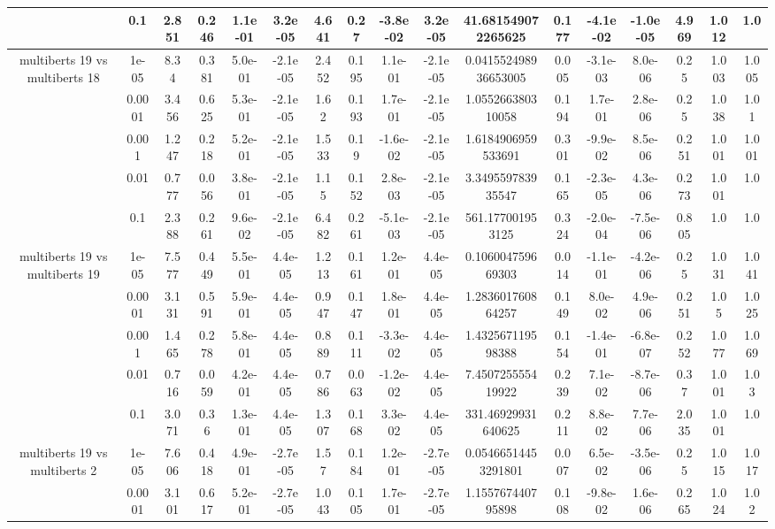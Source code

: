 \begin{tabular}{|c|c|c|c|c|c|c|c|c|c|c|c|c|c|c|c|c|}
 & 0.1 & 2.851 & 0.246 & 1.1e-01 & 3.2e-05 & 4.641 & 0.27 & -3.8e-02 & 3.2e-05 & 41.681549072265625 & 0.177 & -4.1e-02 & -1.0e-05 & 4.969 & 1.012 & 1.0 \\
\hline
\multirow{5}{*}{multiberts 19 vs multiberts 18} & 1e-05 & 8.34 & 0.381 & 5.0e-01 & -2.1e-05 & 2.452 & 0.195 & 1.1e-01 & -2.1e-05 & 0.041552498936653005 & 0.005 & -3.1e-03 & 8.0e-06 & 0.25 & 1.003 & 1.005 \\
 & 0.0001 & 3.456 & 0.625 & 5.3e-01 & -2.1e-05 & 1.62 & 0.193 & 1.7e-01 & -2.1e-05 & 1.055266380310058 & 0.194 & 1.7e-01 & 2.8e-06 & 0.25 & 1.038 & 1.01 \\
 & 0.001 & 1.247 & 0.218 & 5.2e-01 & -2.1e-05 & 1.533 & 0.19 & -1.6e-02 & -2.1e-05 & 1.6184906959533691 & 0.301 & -9.9e-02 & 8.5e-06 & 0.251 & 1.001 & 1.001 \\
 & 0.01 & 0.777 & 0.056 & 3.8e-01 & -2.1e-05 & 1.15 & 0.152 & 2.8e-03 & -2.1e-05 & 3.349559783935547 & 0.165 & -2.3e-05 & 4.3e-06 & 0.273 & 1.001 & 1.0 \\
 & 0.1 & 2.388 & 0.261 & 9.6e-02 & -2.1e-05 & 6.482 & 0.261 & -5.1e-03 & -2.1e-05 & 561.177001953125 & 0.324 & -2.0e-04 & -7.5e-06 & 0.805 & 1.0 & 1.0 \\
\hline
\multirow{5}{*}{multiberts 19 vs multiberts 19} & 1e-05 & 7.577 & 0.449 & 5.5e-01 & 4.4e-05 & 1.213 & 0.161 & 1.2e-01 & 4.4e-05 & 0.106004759669303 & 0.014 & -1.1e-01 & -4.2e-06 & 0.25 & 1.031 & 1.041 \\
 & 0.0001 & 3.131 & 0.591 & 5.9e-01 & 4.4e-05 & 0.947 & 0.147 & 1.8e-01 & 4.4e-05 & 1.283601760864257 & 0.149 & 8.0e-02 & 4.9e-06 & 0.251 & 1.05 & 1.025 \\
 & 0.001 & 1.465 & 0.278 & 5.8e-01 & 4.4e-05 & 0.889 & 0.111 & -3.3e-02 & 4.4e-05 & 1.432567119598388 & 0.154 & -1.4e-01 & -6.8e-07 & 0.252 & 1.077 & 1.069 \\
 & 0.01 & 0.716 & 0.059 & 4.2e-01 & 4.4e-05 & 0.786 & 0.063 & -1.2e-02 & 4.4e-05 & 7.450725555419922 & 0.239 & 7.1e-02 & -8.7e-06 & 0.37 & 1.001 & 1.03 \\
 & 0.1 & 3.071 & 0.36 & 1.3e-01 & 4.4e-05 & 1.307 & 0.168 & 3.3e-02 & 4.4e-05 & 331.46929931640625 & 0.211 & 8.8e-02 & 7.7e-06 & 2.035 & 1.001 & 1.0 \\
\hline
\multirow{5}{*}{multiberts 19 vs multiberts 2} & 1e-05 & 7.606 & 0.418 & 4.9e-01 & -2.7e-05 & 1.57 & 0.184 & 1.2e-01 & -2.7e-05 & 0.05466514453291801 & 0.007 & 6.5e-02 & -3.5e-06 & 0.25 & 1.015 & 1.017 \\
 & 0.0001 & 3.101 & 0.617 & 5.2e-01 & -2.7e-05 & 1.043 & 0.105 & 1.7e-01 & -2.7e-05 & 1.155767440795898 & 0.108 & -9.8e-02 & 1.6e-06 & 0.265 & 1.024 & 1.02 \\

\end{tabular}

